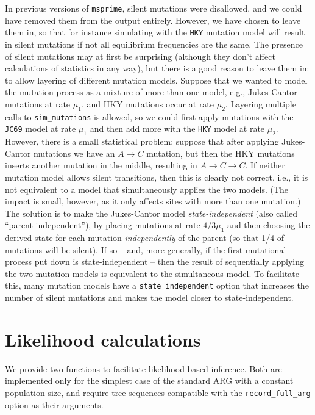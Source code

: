\documentclass{article}
\newcommand{\msprime}[0]{\texttt{msprime}}
\begin{document}
In previous versions of \msprime, silent mutations were disallowed,
and we could have removed them from the output entirely.
However, we have chosen to leave them in, so that for instance
simulating with the \texttt{HKY} mutation model will result in silent mutations
if not all equilibrium frequencies are the same.
The presence of silent mutations may at first be surprising
(although they don't affect calculations of statistics in any way),
but there is a good reason to leave them in:
to allow layering of different mutation models.
Suppose that we wanted to model the mutation process as a mixture of more than one model,
e.g., Jukes-Cantor mutations at rate $\mu_1$, and
HKY mutations occur at rate $\mu_2$.
Layering multiple calls to \texttt{sim\_mutations} is allowed,
so we could first apply mutations with the \texttt{JC69} model at rate $\mu_1$
and then add more with the \texttt{HKY} model at rate $\mu_2$.
However, there is a small statistical problem:
suppose that after applying Jukes-Cantor mutations we have an $A \to C$ mutation,
but then the HKY mutations inserts another mutation in the middle,
resulting in $A \to C \to C$.
If neither mutation model allows silent transitions,
then this is clearly not correct,
i.e., it is not equivalent to a model that simultaneously applies the two models.
(The impact is small, however, as it only affects sites with more than one mutation.)
The solution is to make the Jukes-Cantor model \emph{state-independent}
(also called ``parent-independent''),
by placing mutations at rate $4/3 \mu_1$ and then choosing the derived state for each mutation
\emph{independently} of the parent (so that 1/4 of mutations will be silent).
If so -- and, more generally, if the first mutational process put down is state-independent --
then the result of sequentially applying the two mutation models
is equivalent to the simultaneous model.
To facilitate this, many mutation models have a \texttt{state\_independent} option
that increases the number of silent mutations
and makes the model closer to state-independent.


\section*{Likelihood calculations}
\label{app-likelihoods}

We provide two functions to facilitate likelihood-based inference.
Both are implemented only for the simplest case of the standard ARG with a
constant population size, and require tree sequences compatible with the
\texttt{record\_full\_arg} option as their arguments.
\end{document}
